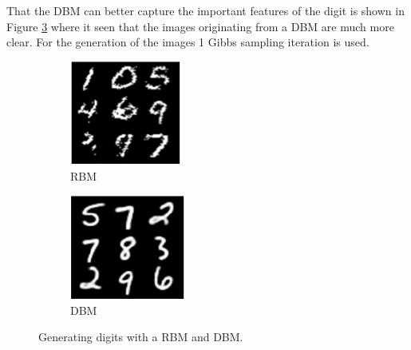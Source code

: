 \documentclass[a4paper,10pt]{article}
\begin{document}
That the DBM can better capture the important features of the digit is shown in Figure \ref{fig:compareDBM2} where it seen that the images originating from a DBM are much more clear. For the generation of the images 1 Gibbs sampling iteration is used. 

\begin{figure}[h]
	\begin{subfigure}{0.49\textwidth}
		\centering
		\includegraphics[width=0.3\linewidth]{DBM_RBM_gen.png}
		\caption{RBM}
		\label{fig:RBM_gen}
	\end{subfigure}	 	
	\begin{subfigure}{0.49\textwidth}
		\centering
		\includegraphics[width=0.3\linewidth]{DBM_gen.png}
		\caption{DBM}
		\label{fig:DBM_gen}
	\end{subfigure}	
	\caption{Generating digits with a RBM and DBM.}
	\label{fig:compareDBM2}
\end{figure}
\end{document}
